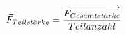 \documentclass[preview]{standalone}
\begin{document}
\begin{align*}
\special{dvisvgm:raw <g id='unique000'>}\vec{F}_{Teilst \ddot{a} rke} = \frac{\overrightarrow{F_{Gesamtst \ddot{a} rke}}} {Teilanzahl}\special{dvisvgm:raw </g>}
\end{align*}
\end{document}
